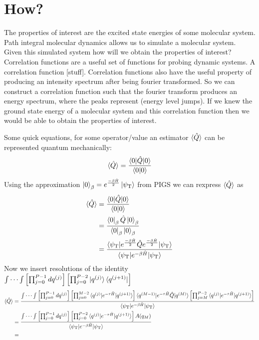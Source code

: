 \documentclass[12pt,letterpaper,oneside,final,titlepage]{article}               %
\numberwithin{equation}{section} %
\newcommand{\psiT}{\psi_{\textrm{T}}}
\begin{document}
\newpage

\section{How?}
The properties of interest are the excited state energies of some molecular system. 
Path integral molecular dynamics allows us to simulate a molecular system. 
Given this simulated system how will we obtain the properties of interest?
Correlation functions are a useful set of functions for probing dynamic systems.
A correlation function [stuff].
Correlation functions also have the useful property of producing an intensity spectrum after being fourier transformed.
So we can construct a correlation function such that the fourier transform produces an energy spectrum, where the peaks
represent (energy level jumps).
If we knew the ground state energy of a molecular system and this correlation function then we would be able to obtain the properties of interest.

Some quick equations, for some operator/value an estimator $\braket{\hat{Q}}$ can be represented quantum mechanically:
\begin{equation}
    \braket{\hat{Q}} = \frac{\braket{0|\hat{Q}|0}}{\braket{0|0}}
\end{equation}
Using the approximation $\ket{0}_{\beta} = e^{\frac{-\beta\hat{H}}{2}}\ket{\psiT}$ 
from PIGS we can rexpress $\braket{\hat{Q}}$ as
\begin{align}
	\braket{\hat{Q}} 
	    &= \frac{\braket{0|\hat{Q}|0}}{\braket{0|0}} 
	\\	&= \frac{\bra{0}_{\beta}\hat{Q}\ket{0}_{\beta}}{\bra{0}_{\beta}\ket{0}_{\beta}}
	\\	&= \frac{\braket{\psiT|e^{\frac{-\beta\hat{H}}{2}}\hat{Q}e^{\frac{-\beta\hat{H}}{2}}|\psiT}}
				{\braket{\psiT|e^{ -\beta\hat{H}}|\psiT}} 
\end{align}
Now we insert resolutions of the identity
$\int\cdots\int\left[\prod_{j=0}^{P-1}dq^{(j)}\right]\left[\prod_{j=0}^{P-2}\ket{q^{(j)}}\bra{q^{(j+1)}}\right]$
\begin{align}
	\braket{\hat{Q}} 
		&=\frac{\int\cdots\int\left[\prod_{j=0}^{P-1}dq^{(j)}\right]
				\left[\prod_{j=0}^{M-2}\braket{q^{(j)}|e^{-\tau\hat{H}}|q^{(j+1)}}\right]
				\braket{q^{(M-1)}|e^{-\tau\hat{H}}\hat{Q}|q^{(M)}}
				\left[\prod_{j=M}^{P-2}\braket{q^{(j)}|e^{-\tau\hat{H}}|q^{(j+1)}}\right]
				}
			   {\braket{\psiT|e^{ -\beta\hat{H}}|\psiT}}
	\\  &=\frac{\int\cdots\int\left[\prod_{j=0}^{P-1}dq^{(j)}\right]
				\left[\prod_{j=0}^{P-2}\braket{q^{(j)}|e^{-\tau\hat{H}}|q^{(j+1)}}\right]
				A(q_{M})
				}
			   {\braket{\psiT|e^{ -\beta\hat{H}}|\psiT}}
	\\	&=
\end{align}
\end{document}
